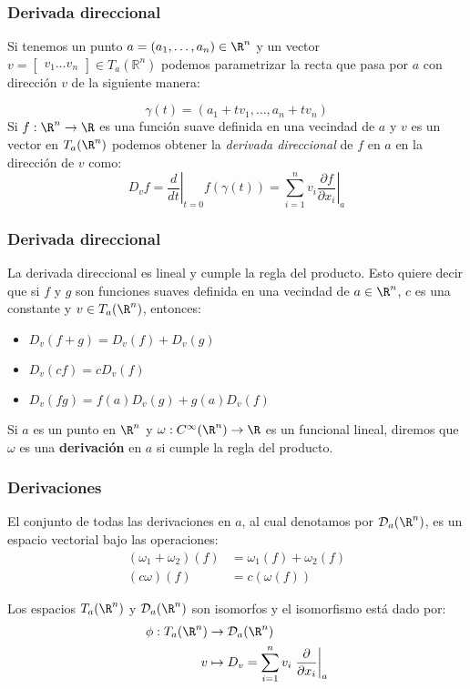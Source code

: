 \begin{frame}
	\frametitle{Derivada direccional}
	Si tenemos un punto $a = (a_1, \dots, a_n) \in \R^n$ y un vector $v = \begin{bmatrix} v_1 \dots v_n \end{bmatrix} \in T_a(\mathbb{R}^{n})$ podemos parametrizar la recta que pasa por $a$ con dirección $v$ de la siguiente manera:

	\[\gamma(t) = (a_1 + tv_1, \dots, a_n + tv_n) \]
	\pause
	Si $f: \R^n \to \R$ es una función suave definida en una vecindad de $a$ y $v$ es un vector en $T_a(\R^n)$ podemos obtener la \textit{derivada direccional} de $f$ en $a$ en la dirección de $v$ como:
	\[
		D_v f = \left. \frac{d}{dt}\right|_{t=0} f(\gamma(t))
		= \sum_{i=1}^{n} v_i \left. \frac{\partial f}{\partial x_i} \right|_{a}
	\]
\end{frame}

\begin{frame}
	\frametitle{Derivada direccional}
	La derivada direccional es lineal y cumple la regla del producto. Esto quiere decir que si $f$ y $g$ son funciones suaves definida en una vecindad de $a \in \R^n$, $c$ es una constante y $v \in T_{a}(\R^n)$, entonces:
	\begin{itemize}
		\item $D_v(f+g) = D_v(f) + D_v(g)$
		\item $D_v(cf) = cD_v(f)$
		\item $D_v(fg) = f(a)D_v(g) + g(a)D_v(f)$
	\end{itemize} \pause

	\begin{definition}
		Si $a$ es un punto en $\R^n$ y $\omega: C^{\infty}(\R^{n}) \to \R$ es un funcional lineal, diremos que $\omega$ es una \textbf{derivación} en $a$ si cumple la regla del producto. 
	\end{definition}
\end{frame}

\begin{frame}
	\frametitle{Derivaciones}
	El conjunto de todas las derivaciones en $a$, al cual denotamos por $\mathcal{D}_a(\R^n)$, es un espacio vectorial bajo las operaciones:
	\begin{align*}
		(\omega_1 + \omega_2)(f) & = \omega_1(f) + \omega_2(f) \\
		(c\omega)(f)             & = c(\omega(f))
	\end{align*} \pause

	\begin{theorem}
		Los espacios $T_a(\R^n)$ y $\mathcal{D}_a(\R^n)$ son isomorfos y el isomorfismo está dado por:
		\begin{align*}
			\phi: T_a(\R^n) & \to \mathcal{D}_a(\R^n)                                                         \\
			v               & \mapsto D_v = \sum_{i=1}^n v_i \left. \frac{\partial}{\partial x_i} \right|_{a}
		\end{align*}
	\end{theorem}
\end{frame}

